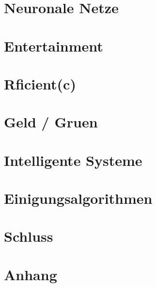 \documentclass{wseminar}
\begin{document}
\begin{sloppypar}
	
	
	\section{Neuronale Netze}	
	
	\pagebreak
	
	
	
	\section{Entertainment}	
	
	\pagebreak
	
	
	
	\section{Rficient(c)}	
	
	\pagebreak
	
	
	
	\section{Geld / Gruen}	

	\pagebreak
	
	
	
	\section{Intelligente Systeme}	
	
	\pagebreak
	
	
	
	\section{Einigungsalgorithmen}	
	
	\pagebreak
	
	
	
	\section{Schluss}
	
	\pagebreak
	
	
	
	\section{Anhang}

	\pagebreak
	

\end{sloppypar}
\end{document}
